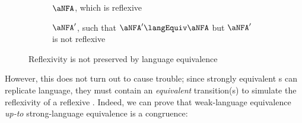 \begin{figure}[ht]
    \centering
    \begin{subfigure}{0.5\textwidth}
        \centering
        \caption{$\aNFA$, which is reflexive}
    \end{subfigure}%
    \begin{subfigure}{0.5\textwidth}
        \centering
        \caption{$\aNFA'$, such that $\aNFA' \langEquiv \aNFA$ but $\aNFA'$ is
        not reflexive}
    \end{subfigure}%
    \caption{Reflexivity is not preserved by language equivalence}
    \label{fig:reflexivityNotPreservedByLangEquiv}
\end{figure}

However, this does not turn out to cause trouble; since strongly equivalent
\TNFA{}s can replicate language, they must contain an \emph{equivalent}
transition(s) to simulate the reflexivity of a reflexive \TNFA{}. Indeed, we
can prove that weak-language equivalence \emph{up-to} strong-language
equivalence is a congruence:

